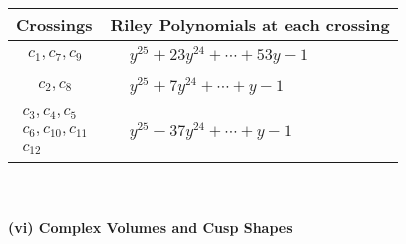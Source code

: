 \documentclass[1p]{elsarticle_modified}
\theoremstyle{definition}
\begin{document}
\begin{tabular}{m{50pt}|m{274pt}}
Crossings & \hspace{64pt}Riley Polynomials at each crossing \\
\hline $$\begin{aligned}c_{1},c_{7},c_{9}\end{aligned}$$&$\begin{aligned}
&y^{25}+23 y^{24}+\cdots+53 y-1
\end{aligned}$\\
\hline $$\begin{aligned}c_{2},c_{8}\end{aligned}$$&$\begin{aligned}
&y^{25}+7 y^{24}+\cdots+y-1
\end{aligned}$\\
\hline $$\begin{aligned}c_{3},c_{4},c_{5}\\c_{6},c_{10},c_{11}\\c_{12}\end{aligned}$$&$\begin{aligned}
&y^{25}-37 y^{24}+\cdots+y-1
\end{aligned}$\\
\hline
\end{tabular}\\~\\
\newpage\flushleft \textbf{(vi) Complex Volumes and Cusp Shapes}
\end{document}
